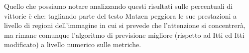 \documentclass[%
	corpo=12pt,
    twoside,
    stile=classica,
    oldstyle,
    tipotesi=custom,
    greek,
    evenboxes,
]{toptesi}
\begin{document}
{Quello che possiamo notare analizzando questi risultati sulle percentuali di vittorie è che: tagliando parte del testo Matzen peggiora le sue prestazioni a livello di regioni dell'immagine in cui si prevede che l'attenzione si concentrerà, ma rimane comunque l'algoritmo di previsione migliore (rispetto ad Itti ed Itti modificato) a livello numerico  sulle metriche.
%



}
\end{document}

